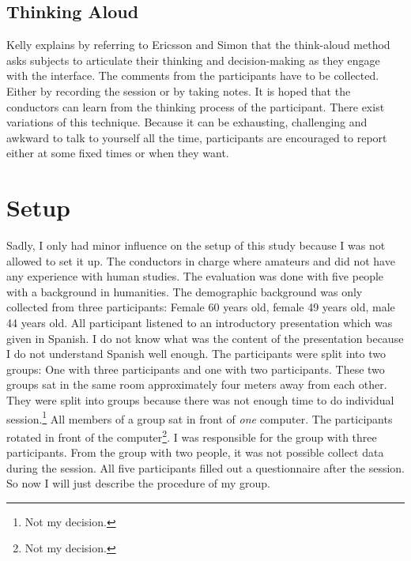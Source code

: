 \documentclass[11pt]{report}
\begin{document}
\subsection{Thinking Aloud}

Kelly \cite{Kelly2007} explains by referring to Ericsson and Simon \cite{Ericsson1993} that the think-aloud method asks subjects to articulate their thinking and decision-making as they engage with the interface. The comments from the participants have to be collected. Either by recording the session or by taking notes. It is hoped that the conductors can learn from the thinking process of the participant. There exist variations of this technique. Because it can be exhausting, challenging and awkward to talk to yourself all the time, participants are encouraged to report either at some fixed times or when they want.

\section{Setup}

Sadly, I only had minor influence on the setup of this study because I was not allowed to set it up. The conductors in charge where amateurs and did not have any experience with human studies. The evaluation was done with five people with a background in humanities. The demographic background was only collected from three participants: Female 60 years old, female 49 years old, male 44 years old. All participant listened to an introductory presentation which was given in Spanish. I do not know what was the content of the presentation because I do not understand Spanish well enough. The participants were split into two groups: One with three participants and one with two participants. These two groups sat in the same room approximately four meters away from each other. They were split into groups because there was not enough time to do individual session.\footnote{Not my decision.} All members of a group sat in front of \textit{one} computer. The participants rotated in front of the computer\footnote{Not my decision.}. I was responsible for the group with three participants. From the group with two people, it was not possible collect data during the session. All five participants filled out a questionnaire after the session. So now I will just describe the procedure of my group. \\
\end{document}
